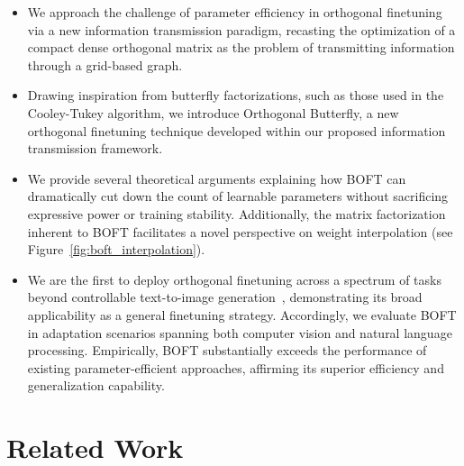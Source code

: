 \begin{itemize}[leftmargin=*,nosep]
    \item We approach the challenge of parameter efficiency in orthogonal finetuning via a new information transmission paradigm, recasting the optimization of a compact dense orthogonal matrix as the problem of transmitting information through a grid-based graph.
    \item Drawing inspiration from butterfly factorizations, such as those used in the Cooley-Tukey algorithm, we introduce Orthogonal Butterfly, a new orthogonal finetuning technique developed within our proposed information transmission framework.
    \item We provide several theoretical arguments explaining how BOFT can dramatically cut down the count of learnable parameters without sacrificing expressive power or training stability. Additionally, the matrix factorization inherent to BOFT facilitates a novel perspective on weight interpolation (see Figure~\ref{fig:boft_interpolation}).
    \item We are the first to deploy orthogonal finetuning across a spectrum of tasks beyond controllable text-to-image generation~\cite{qiu2023controlling}, demonstrating its broad applicability as a general finetuning strategy. Accordingly, we evaluate BOFT in adaptation scenarios spanning both computer vision and natural language processing. Empirically, BOFT substantially exceeds the performance of existing parameter-efficient approaches, affirming its superior efficiency and generalization capability.
\end{itemize}

\section{Related Work}

